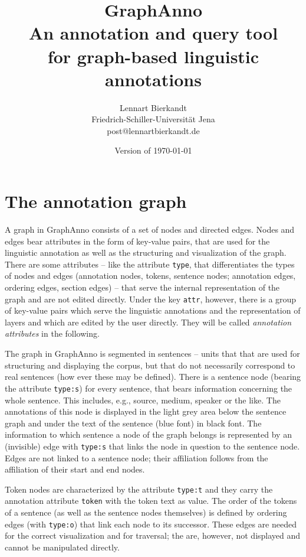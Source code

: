 \documentclass[12pt]{scrartcl}
\title{\LARGE GraphAnno\\ \large An annotation and query tool\\for graph-based linguistic annotations}
\author{Lennart Bierkandt\\\large Friedrich-Schiller-Universität Jena\\[-.2em]\large post@lennartbierkandt.de}
\date{Version of \today}
\begin{document}
\maketitle

\renewcommand{\baselinestretch}{1.05}\normalsize

\tableofcontents


\section{The annotation graph}

A graph in GraphAnno consists of a set of nodes and directed edges.
Nodes and edges bear attributes in the form of key-value pairs, that are used for the linguistic annotation as well as the structuring and visualization of the graph.
There are some attributes – like the attribute \texttt{type}, that differentiates the types of nodes and edges (annotation nodes, tokens, sentence nodes; annotation edges, ordering edges, section edges) – that serve the internal representation of the graph and are not edited directly.
Under the key \texttt{attr}, however, there is a group of key-value pairs which serve the linguistic annotations and the representation of layers and which are edited by the user directly.
They will be called \textit{annotation attributes} in the following.

The graph in GraphAnno is segmented in sentences – units that that are used for structuring and displaying the corpus, but that do not necessarily correspond to real sentences (how ever these may be defined).
There is a sentence node (bearing the attribute \texttt{type:s}) for every sentence, that bears information concerning the whole sentence.
This includes, e.g., source, medium, speaker or the like.
The annotations of this node is displayed in the light grey area below the sentence graph and under the text of the sentence (blue font) in black font.
The information to which sentence a node of the graph belongs is represented by an (invisible) edge with \texttt{type:s} that links the node in question to the sentence node.
Edges are not linked to a sentence node; their affiliation follows from the affiliation of their start and end nodes.

Token nodes are characterized by the attribute \texttt{type:t} and they carry the annotation attribute \texttt{token} with the token text as value.
The order of the tokens of a sentence (as well as the sentence nodes themselves) is defined by ordering edges (with \texttt{type:o}) that link each node to its successor.
These edges are needed for the correct visualization and for traversal; the are, however, not displayed and cannot be manipulated directly.
\end{document}
